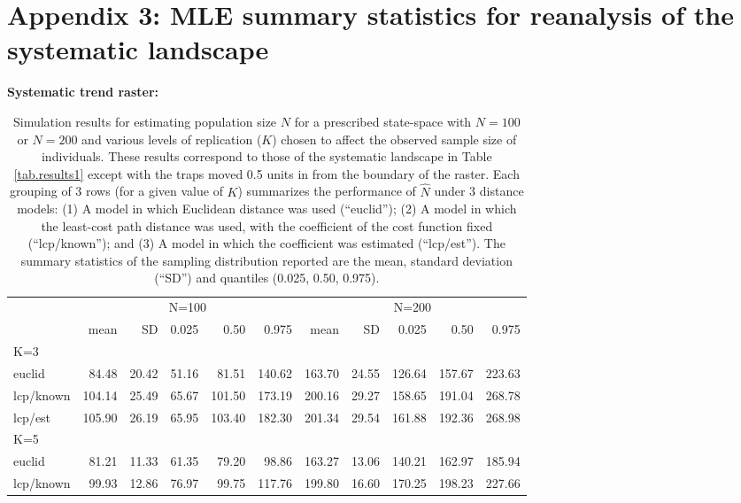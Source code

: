 \documentclass[12pt]{article}
\begin{document}
\newpage


\section*{Appendix 3:  MLE summary statistics for reanalysis of the
  systematic landscape}



\begin{table}[ht]
{\small
\caption{Simulation results for estimating population size $N$ for a prescribed state-space with
$N=100$ or $N=200$ and various levels of replication ($K$) chosen to affect the observed sample
size of individuals. These results correspond to those of the
systematic landscape in Table \ref{tab.results1} except with the traps
moved 0.5 units in from the boundary of the raster.
Each grouping of 3 rows (for a given value of $K$) summarizes the
performance of $\hat{N}$ under 3 distance models: (1) A model in which
Euclidean distance was used (``euclid''); (2) A model in which the
least-cost path distance was used, with the coefficient of the cost
function fixed (``lcp/known''); and (3) A model in which the
coefficient was estimated (``lcp/est''). The summary statistics of the
sampling distribution reported are the mean, standard deviation
(``SD'') and quantiles (0.025, 0.50, 0.975).
}
{\bf Systematic trend raster:} \\
\begin{tabular}{l|rrrrr|rrrrr}
         & \multicolumn{5}{c}{N=100   } & \multicolumn{5}{c}{N=200  }  \\
         &   mean &  SD  & 0.025 & 0.50 & 0.975  & mean  & SD   & 0.025 & 0.50  & 0.975 \\ \hline
K=3      &        &      &       &      &        &       &      &       &       &       \\
euclid   &   84.48& 20.42& 51.16 & 81.51& 140.62 &163.70 &24.55 &126.64 &157.67 &223.63 \\
lcp/known&  104.14& 25.49& 65.67 &101.50& 173.19 &200.16 &29.27 &158.65 &191.04 &268.78\\
lcp/est  &  105.90& 26.19& 65.95 &103.40& 182.30 &201.34 &29.54 &161.88 &192.36 &268.98\\
K=5      &        &      &       &      &        &       &      &       &       &       \\
euclid   & 81.21  &11.33 &61.35  &79.20 & 98.86  &163.27 &13.06 &140.21 &162.97 &185.94\\
lcp/known& 99.93  &12.86 &76.97  &99.75 &117.76  &199.80 &16.60 &170.25 &198.23 &227.66\\

\end{tabular}}
\end{table}
\end{document}
